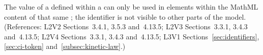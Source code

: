 The  value of a \Parameter defined within a \KineticLaw
can only be used in  elements within the MathML content
of that same \KineticLaw; the identifier is not visible to other
parts of the model.  (References: L2V2 Sections~3.4.1, 3.5.3 
and~4.13.5; L2V3 Sections~3.3.1, 3.4.3 and~4.13.5; L2V4 Sections~3.3.1, 
3.4.3 and~4.13.5; L3V1 Sections~\ref{sec:identifiers}, \ref{sec:ci-token}
and~\ref{subsec:kinetic-law}.)
